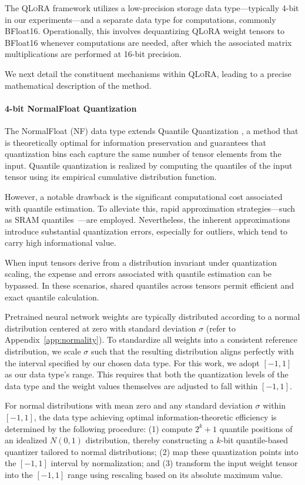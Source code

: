 The \textsc{QLoRA} framework utilizes a low-precision storage data type—typically 4-bit in our experiments—and a separate data type for computations, commonly BFloat16. Operationally, this involves dequantizing \textsc{QLoRA} weight tensors to BFloat16 whenever computations are needed, after which the associated matrix multiplications are performed at 16-bit precision.

We next detail the constituent mechanisms within \textsc{QLoRA}, leading to a precise mathematical description of the method.

\paragraph{4-bit NormalFloat Quantization} The NormalFloat (NF) data type extends Quantile Quantization \citep{dettmers2022optimizers}, a method that is theoretically optimal for information preservation and guarantees that quantization bins each capture the same number of tensor elements from the input. Quantile quantization is realized by computing the quantiles of the input tensor using its empirical cumulative distribution function.

However, a notable drawback is the significant computational cost associated with quantile estimation. To alleviate this, rapid approximation strategies—such as SRAM quantiles~\citep{dettmers2022optimizers}—are employed. Nevertheless, the inherent approximations introduce substantial quantization errors, especially for outliers, which tend to carry high informational value.

When input tensors derive from a distribution invariant under quantization scaling, the expense and errors associated with quantile estimation can be bypassed. In these scenarios, shared quantiles across tensors permit efficient and exact quantile calculation.

Pretrained neural network weights are typically distributed according to a normal distribution centered at zero with standard deviation $\sigma$ (refer to Appendix~\ref{app:normality}). To standardize all weights into a consistent reference distribution, we scale $\sigma$ such that the resulting distribution aligns perfectly with the interval specified by our chosen data type. For this work, we adopt $[-1, 1]$ as our data type’s range. This requires that both the quantization levels of the data type and the weight values themselves are adjusted to fall within $[-1, 1]$.

For normal distributions with mean zero and any standard deviation $\sigma$ within $[-1, 1]$, the data type achieving optimal information-theoretic efficiency is determined by the following procedure: (1) compute $2^k+1$ quantile positions of an idealized $N(0, 1)$ distribution, thereby constructing a $k$-bit quantile-based quantizer tailored to normal distributions; (2) map these quantization points into the $[-1, 1]$ interval by normalization; and (3) transform the input weight tensor into the $[-1, 1]$ range using rescaling based on its absolute maximum value.

